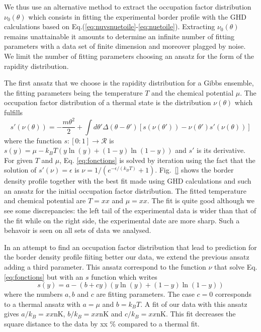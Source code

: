 \documentclass[submission, Phys]{SciPost}
\begin{document}
We thus use an alternative method to extract the occupation factor distribution $\nu_0 (\theta)$ which consists in fitting the experimental border  profile with the GHD calculations based on Eq.(\ref{eq:nuvsnuetoile}-\ref{eq:nuetoile}). 
Extracting $\nu_0 (\theta)$ remains unattainable it amounts to 
determine an infinite number of fitting parameters  with a data set of finite dimension and moreover plagged by noise. 
We limit the number of fitting parameters  choosing an ansatz for the form of the rapidity distribution.

The first ansatz that we choose is the rapidity distribution for a Gibbs ensemble, the fitting parameters being the temperature $T$ and the chemical potential $\mu$.
The occupation factor distribution of a thermal state is the distribution 
$\nu(\theta)$ which fulfills
\begin{equation}
\label{eq:fonctions}
     s'(\nu(\theta)) = -\frac{m\theta^2}{2} + \int d\theta' \Delta(\theta-\theta')
    \left [ s(\nu(\theta')) - \nu(\theta')s'(\nu(\theta)) \right ]
\end{equation}
where the function $s:[0:1]\rightarrow {\mathcal R}$ is
$    s(y)= \mu -k_BT\left( y\ln(y) +(1-y)\ln(1-y) \right ) $
and $s'$ is its derivative. For given $T$ and $\mu$, Eq. \eqref{eq:fonctions} is solved  by iteration using the fact that the solution of $s'(\nu)=\epsilon$ is $\nu=1/(e^{-\epsilon/(k_BT)}+1)$.
Fig.~\ref{} shows the border density profile together with the best fit made using GHD calculations and such an ansatz for the initial occupation factor distribution. The fitted temperature and chemical potential are 
$T=xx$ and $\mu=xx$.
The fit is quite good although we see some discrepancies: the left tail of the experimental data is wider than that of the fit while on the right side, the experimental date are more sharp. Such a behavoir is seen on all sets of data we analysed.

In an attempt to find an occupation factor distribution that lead to prediction for the border density profile fiiting better our data, we extend the 
previous ansatz adding a third parameter. This ansatz correspond to the function $\nu$ that solve Eq.\eqref{eq:fonctions} but with an $s$ function which writes
\begin{equation}
    s(y)= a -(b+cy)\left( y\ln(y) +(1-y)\ln(1-y) \right ) 
\end{equation}
where the numbers $a,b$ and $c$ are fitting parameters.
 The case $c=0$ corresponds to a thermal ansatz with $a=\mu$ 
 and $b=k_B T$.
A fit of our data with this ansatz gives $a/k_B=xx$nK, $b/k_B=xx$nK and 
$c/k_B=xx$nK. This fit decreases the square distance
to the data by  xx \% compared to a thermal fit. 
\end{document}
